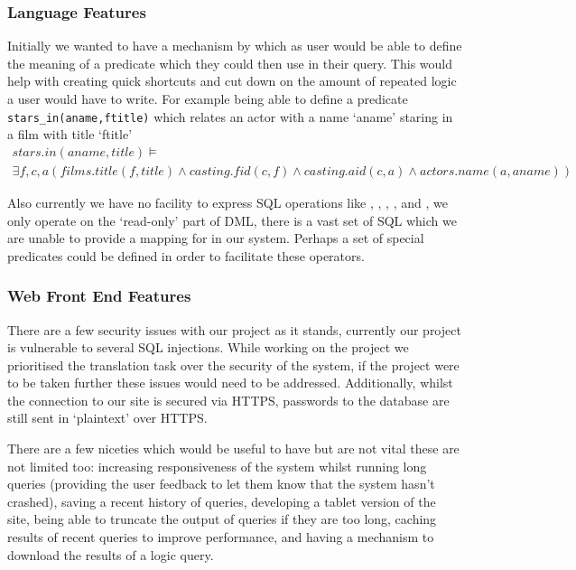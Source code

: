 \documentclass[a4paper, 11pt]{article}
\begin{document}
    \subsubsection{Language Features}
    Initially we wanted to have a mechanism by which as user would be able to
    define the meaning of a predicate which they could then use in their query.
    This would help with creating quick shortcuts and cut down on the amount of 
    repeated logic a user would have to write. For example being able to define a 
    predicate \texttt{stars\_in(aname,ftitle)} which relates an actor with a name 
    `aname' staring in a film with title `ftitle'
    \begin{multline}
      stars.in(aname, title) \models \\ \exists  f,c,a (films.title(f,title) \land
      casting.fid(c,f) \land casting.aid(c,a) \land actors.name(a,aname))
    \end{multline}

    Also currently we have no facility to express SQL operations like
    , , , , and
    , we only operate on the `read-only' part of DML, there is a
    vast set of SQL which we are unable to provide a mapping for in our system.
    Perhaps a set of special predicates could be defined in order to facilitate
    these operators.

    \subsubsection{Web Front End Features}
    There are a few security issues with our project as it stands, currently our 
    project is vulnerable to several SQL injections. While working on the project
    we prioritised the translation task over the security of the system, if the 
    project were to be taken further these issues would need to be addressed. 
    Additionally, whilst the connection to our site is secured via HTTPS, 
    passwords to the database are still sent in `plaintext' over HTTPS.

    There are a few niceties which would be useful to have but are not vital
    these are not limited too: increasing responsiveness of the system whilst 
    running long queries (providing the user feedback to let them know that the
    system hasn't crashed), saving a recent history of queries, developing a 
    tablet version of the site, being able to truncate the output of queries if 
    they are too long, caching results of recent queries to improve performance,
    and having a mechanism to download the results of a logic query.  
\end{document}
